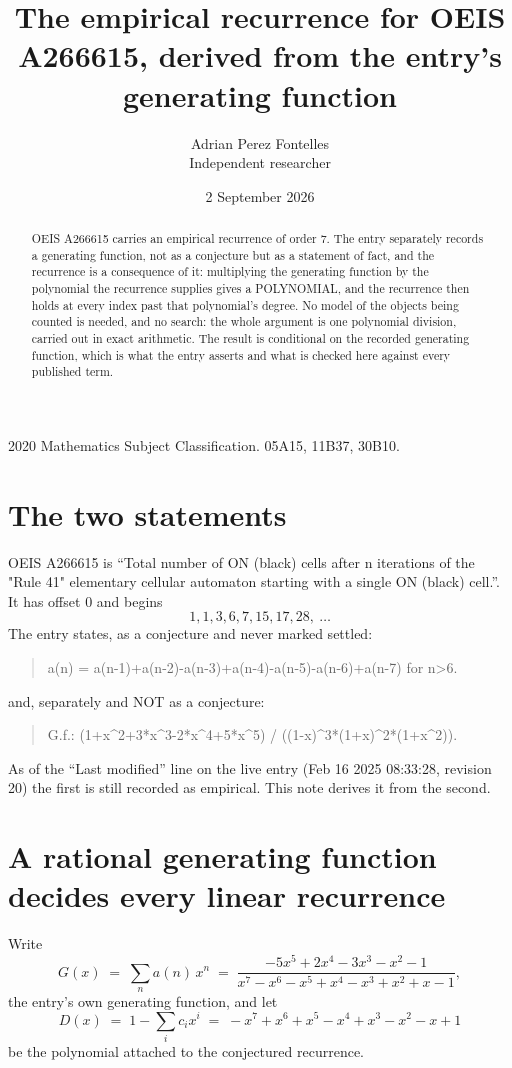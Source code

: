 \documentclass[11pt,a4paper]{article}
\title{The empirical recurrence for OEIS A266615, derived from the entry's generating function}
\author{Adrian Perez Fontelles\\ \small Independent researcher}
\date{2 September 2026}
\theoremstyle{plain}
\theoremstyle{definition}
\begin{document}
\maketitle

\begin{abstract}
OEIS A266615 carries an empirical recurrence of order $7$. The entry separately records a
generating function, not as a conjecture but as a statement of fact, and the recurrence is a
consequence of it: multiplying the generating function by the polynomial the recurrence
supplies gives a POLYNOMIAL, and the recurrence then holds at every index past that
polynomial's degree. No model of the objects being counted is needed, and no search: the
whole argument is one polynomial division, carried out in exact arithmetic. The result is
conditional on the recorded generating function, which is what the entry asserts and what is
checked here against every published term.
\end{abstract}

\noindent\small 2020 Mathematics Subject Classification. 05A15, 11B37, 30B10.\normalsize

\section{The two statements}

OEIS A266615 is ``Total number of ON (black) cells after n iterations of the "Rule 41" elementary cellular automaton starting with a single ON (black) cell.''. It has offset $0$ and begins
\[
1, 1, 3, 6, 7, 15, 17, 28,\ \dots
\]
The entry states, as a conjecture and never marked settled:
\begin{quote}
a(n) = a(n-1)+a(n-2)-a(n-3)+a(n-4)-a(n-5)-a(n-6)+a(n-7) for n>6.
\end{quote}
and, separately and NOT as a conjecture:
\begin{quote}
G.f.: (1+x\^{}2+3*x\^{}3-2*x\^{}4+5*x\^{}5) / ((1-x)\^{}3*(1+x)\^{}2*(1+x\^{}2)).
\end{quote}
As of the ``Last modified'' line on the live entry (Feb 16 2025 08:33:28, revision 20) the first is still
recorded as empirical. This note derives it from the second.

\section{A rational generating function decides every linear recurrence}

Write
\[
G(x)\;=\;\sum_{n}a(n)\,x^{n}\;=\;\frac{- 5 x^{5} + 2 x^{4} - 3 x^{3} - x^{2} - 1}{x^{7} - x^{6} - x^{5} + x^{4} - x^{3} + x^{2} + x - 1},
\]
the entry's own generating function, and let
\[
D(x)\;=\;1-\sum_i c_i x^{i}\;=\;- x^{7} + x^{6} + x^{5} - x^{4} + x^{3} - x^{2} - x + 1
\]
be the polynomial attached to the conjectured recurrence.
\end{document}
